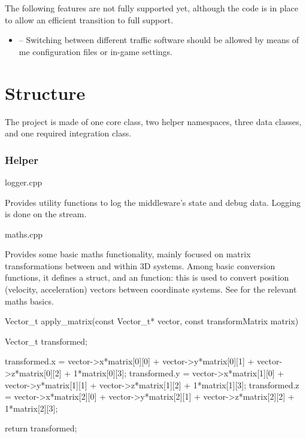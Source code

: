 The following \glspl{feature} are not fully supported yet, although the code is in place to allow an efficient transition to full support.

\begin{itemize}
	\item {} -- Switching between different traffic software should be allowed by means of \gls{me} configuration files or in-game settings.
\end{itemize}

\section{Structure}\label{sc:middleware:structure}

The project is made of one core class, two helper namespaces, three data classes, and one required integration class.

\subsubsection{Helper}

\begin{filelist}
	logger.cpp
\end{filelist}

Provides utility functions to log the \gls{middleware}'s state and debug data. Logging is done on the  stream.

\begin{filelist}
	maths.cpp
\end{filelist}

Provides some basic maths functionality, mainly focused on matrix transformations between and within 3D systems. Among basic conversion functions, it defines a  struct, and an  function: this is used to convert position (velocity, acceleration) vectors between coordinate systems. See  for the relevant maths basics.

\begin{codelist}{1}
	Vector_t apply_matrix(const Vector_t* vector, const transformMatrix matrix) {
		Vector_t transformed;

		transformed.x = vector->x*matrix[0][0] + vector->y*matrix[0][1] +
						vector->z*matrix[0][2] + 1*matrix[0][3];
		transformed.y = vector->x*matrix[1][0] + vector->y*matrix[1][1] +
						vector->z*matrix[1][2] + 1*matrix[1][3];
		transformed.z = vector->x*matrix[2][0] + vector->y*matrix[2][1] +
						vector->z*matrix[2][2] + 1*matrix[2][3];

		return transformed;
	}
\end{codelist}

